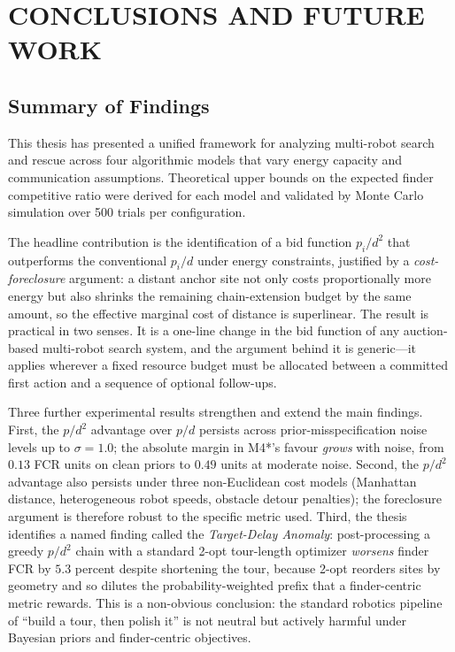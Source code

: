 \chapter{CONCLUSIONS AND FUTURE WORK}\label{ch:conclusion}

\begin{doublespacing}

\section{Summary of Findings}

This thesis has presented a unified framework for analyzing multi-robot
search and rescue across four algorithmic models that vary energy
capacity and communication assumptions. Theoretical upper bounds on
the expected finder competitive ratio were derived for each model and
validated by Monte Carlo simulation over 500 trials per configuration.

The headline contribution is the identification of a bid function
$p_i / d^2$ that outperforms the conventional $p_i / d$ under energy
constraints, justified by a \emph{cost-foreclosure} argument: a
distant anchor site not only costs proportionally more energy but
also shrinks the remaining chain-extension budget by the same amount,
so the effective marginal cost of distance is superlinear. The result
is practical in two senses. It is a one-line change in the bid
function of any auction-based multi-robot search system, and the
argument behind it is generic---it applies wherever a fixed resource
budget must be allocated between a committed first action and a
sequence of optional follow-ups.

Three further experimental results strengthen and extend the main
findings. First, the $p/d^2$ advantage over $p/d$ persists across
prior-misspecification noise levels up to $\sigma = 1.0$; the
absolute margin in M4*'s favour \emph{grows} with noise, from $0.13$
FCR units on clean priors to $0.49$ units at moderate noise. Second,
the $p/d^2$ advantage also persists under three non-Euclidean cost
models (Manhattan distance, heterogeneous robot speeds, obstacle
detour penalties); the foreclosure argument is therefore robust to
the specific metric used. Third, the thesis identifies a named
finding called the \emph{Target-Delay Anomaly}: post-processing a
greedy $p/d^2$ chain with a standard 2-opt tour-length optimizer
\emph{worsens} finder FCR by $5.3$ percent despite shortening the
tour, because 2-opt reorders sites by geometry and so dilutes the
probability-weighted prefix that a finder-centric metric rewards.
This is a non-obvious conclusion: the standard robotics pipeline of
``build a tour, then polish it'' is not neutral but actively
harmful under Bayesian priors and finder-centric objectives.


\end{doublespacing}
